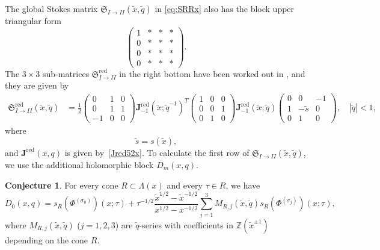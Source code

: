 \documentclass[12pt,reqno]{amsart}
\theoremstyle{definition}
\newtheorem{conjecture}[theorem]{Conjecture}
\def\IZ{\mathbb{Z}}
\def\s{\sigma}
\def\tq{\tilde{q}}
\def\tx{\tilde{x}}
\def\-{\,-\,}
\def\tx{\tilde{x}}
\def\bJ{\mathbf J}
\def\RED{\mathrm{red}}
\def\ts{\tilde{s}}
\def\mf{\mathfrak}
\def\IZ{\mathbb{Z}}
\DeclareMathOperator{\imag}{Im}
\begin{document}
The global Stokes matrix $\mf{S}_{I\rightarrow II}(\tx,\tq)$ in
\eqref{eq:SRRx} also has the block upper triangular form
\begin{equation}
  \begin{pmatrix}
    1&*&*&*\\
    0&*&*&*\\
    0&*&*&*\\
    0&*&*&*
  \end{pmatrix}.
\end{equation}
The $3\times 3$ sub-matrices $\mf{S}^{\text{red}}_{I\rightarrow II}$
in the right bottom have been worked out in \cite{GGM:peacock}, and
they are given by
%
\begin{subequations}
\begin{align}
\mf{S}^{\text{red}}_{I\rightarrow II}(\tx,\tq)
&=\frac{1}{2}
\begin{pmatrix}
0&1&0\\0&1&1\\-1&0&0
\end{pmatrix} \bJ^\RED_{-1}(\tx;\tq^{-1})^T
\begin{pmatrix}
1&0&0\\0&0&1\\0&1&0
\end{pmatrix} \bJ^\RED_{-1}(\tx;\tq)
\begin{pmatrix}
 0&0&-1\\1&-\ts&0\\0&1&0
\end{pmatrix},
\quad
|\tq|<1,\label{eq:SRed12x}
\end{align}
\end{subequations}
where
\begin{equation}
  \ts = s(\tx),
\end{equation}
and $\bJ^{\RED}(x,q)$ is given by~\eqref{Jred52x}. To calculate the first row of
$\mf{S}_{I\rightarrow II}(\tx,\tq)$, we use the additional holomorphic block $D_m(x,q)$.
\begin{conjecture}
  For every cone $R\subset \Lambda(x)$ and every $\tau \in R$, we have
  \begin{equation}
    D_0(x,q) = s_R(\Phi^{(\s_0)})(x;\tau) +
    \tau^{-1/2}\frac{\tx^{1/2}-\tx^{-1/2}}{x^{1/2}-x^{-1/2}}
    \sum_{j=1}^3 M_{R,j}(\tx,\tq)s_R(\Phi^{(\s_j)})(x;\tau),
    \label{eq:QMPhix}
  \end{equation}
  where $M_{R,j}(\tx,\tq)$ ($j=1,2,3$) are $\tq$-series %
  with coefficients in $\IZ(\tx^{\pm 1})$ depending on the
  cone $R$.
\end{conjecture}
\end{document}
